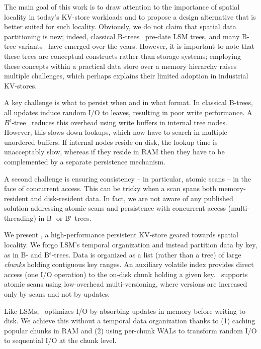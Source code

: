 The main goal of this work is to draw attention to the importance of spatial locality in 
today's KV-store workloads and to propose a design alternative  that is better suited for such locality. 
Obviously, we do not claim that spatial data partitioning is new; indeed, classical B-trees~\cite{DBLP:conf/sigmod/BayerM70,Comer79} 
 pre-date  LSM trees, and many B-tree variants~\cite{Brodal:2003:LBE:644108.644201,Bender15, Lehman:1981:ELC:319628.319663} have  emerged over the years. 
 However, it is important to note that these trees are  conceptual constructs rather than storage systems; 
 employing these concepts within a practical data store over a memory hierarchy 
 raises multiple challenges,  which perhaps explains their limited adoption in industrial KV-stores.
 
A key challenge is what to persist when and in what format. 
In classical B-trees, all updates induce random I/O to leaves, resulting in poor write performance. 
A $B^{\epsilon}$-tree~\cite{Brodal:2003:LBE:644108.644201}  reduces this overhead using  write buffers in internal tree nodes. 
However, this slows down lookups, which now have to search in multiple unordered buffers. 
If internal  nodes reside on disk, the lookup time is unacceptably slow, whereas
if they reside in RAM then they have to be complemented by a separate persistence mechanism. 

A second challenge is ensuring consistency -- in particular, atomic scans --  in the face of concurrent access. 
This can be  tricky when a scan spans both memory-resident and disk-resident data.
In fact, we are not aware of any published solution addressing atomic scans and persistence with concurrent access (multi-threading) in  B- or  B$^\epsilon$-trees.

We present \sys, a high-performance persistent KV-store geared towards spatial locality. %
We forgo LSM's temporal  organization and instead partition data by key, as in B- and B$^\epsilon$-trees. 
Data is organized  as a list (rather than a tree) of large \emph{chunks} holding contiguous key ranges.
An auxiliary volatile index provides direct access (one I/O operation) to the on-disk chunk holding a given key.  
\sys\ supports atomic scans using low-overhead multi-versioning, where versions are increased only by scans and not by updates. 

Like  LSMs,  \sys\ optimizes I/O by absorbing updates in memory before writing to disk. 
We achieve this without a temporal data organization thanks to (1) caching popular chunks in RAM and (2) using
per-chunk WALs to transform  random I/O to sequential I/O at the chunk level. 


